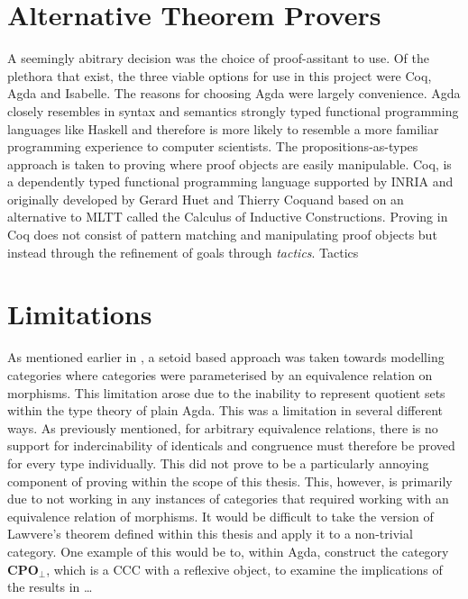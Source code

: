 
\section{Alternative Theorem Provers}
A seemingly abitrary decision was the choice of proof-assitant to use. Of the
plethora that exist, the three viable options for use in this project were Coq,
Agda and Isabelle. The reasons for choosing Agda were largely convenience. Agda
closely resembles in syntax and semantics strongly typed functional programming
languages like Haskell and therefore is more likely to resemble a more familiar
programming experience to computer scientists. The propositions-as-types
approach is taken to proving where proof objects are easily manipulable. Coq, is
a dependently typed functional programming language supported by INRIA and
originally developed by Gerard Huet and Thierry Coquand based on an alternative
to MLTT called the Calculus of Inductive Constructions. Proving in Coq does not
consist of pattern matching and manipulating proof objects but instead through
the refinement of goals through \textit{tactics}. Tactics 
\section{Limitations}
As mentioned earlier in , a setoid based approach was taken towards
modelling categories where categories were parameterised by an equivalence
relation on morphisms. This limitation arose due to the inability to represent
quotient sets within the type theory of plain Agda. This was a limitation in
several different ways. As previously mentioned, for arbitrary equivalence
relations, there is no support for indercinability of identicals and congruence
must therefore be proved for every type individually. This did not prove to be a
particularly annoying component of proving within the scope of this thesis.
This, however, is primarily due to not working in any instances of categories
that required working with an equivalence relation of morphisms. It would be
difficult to take the version of Lawvere's theorem defined within this thesis
and apply it to a non-trivial category. One example of this would be to, within
Agda, construct the category $\bm{CPO}_{\bot}$, which is a CCC with a reflexive
object, to examine the implications of the results in \ldots{}


